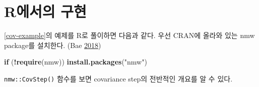 \documentclass[
  11pt,
  krantz2, a4paper, twoside]{krantz}
\newenvironment{Shaded}{\begin{snugshade}}{\end{snugshade}}
\newcommand{\ControlFlowTok}[1]{\textcolor[rgb]{0.13,0.29,0.53}{\textbf{#1}}}
\newcommand{\KeywordTok}[1]{\textcolor[rgb]{0.13,0.29,0.53}{\textbf{#1}}}
\newcommand{\NormalTok}[1]{#1}
\newcommand{\OperatorTok}[1]{\textcolor[rgb]{0.81,0.36,0.00}{\textbf{#1}}}
\newcommand{\StringTok}[1]{\textcolor[rgb]{0.31,0.60,0.02}{#1}}
\theoremstyle{definition}
\theoremstyle{definition}
\theoremstyle{definition}
\theoremstyle{remark}
\begin{document}
\hypertarget{ruxc5d0uxc11cuxc758-uxad6cuxd604}{%
\section{R에서의 구현}\label{ruxc5d0uxc11cuxc758-uxad6cuxd604}}

\ref{cov-example}의 예제를 R로 풀이하면 다음과 같다. 우선 CRAN에 올라와 있는 nmw package를 설치한다. (Bae \protect\hyperlink{ref-R-nmw}{2018})

\begin{Shaded}
\begin{Highlighting}[]
\ControlFlowTok{if}\NormalTok{ (}\OperatorTok{!}\KeywordTok{require}\NormalTok{(nmw)) }\KeywordTok{install.packages}\NormalTok{(}\StringTok{"nmw"}\NormalTok{)}
\end{Highlighting}
\end{Shaded}

\texttt{nmw::CovStep()} 함수를 보면 covariance step의 전반적인 개요를 알 수 있다.
\end{document}
